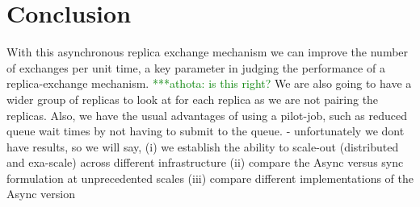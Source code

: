 \documentclass[a4paper,10pt]{article}
\newcommand{\athotanote}[1]{ {\textcolor{green} { ***athota: #1 }}}
\newcommand{\athotanote}[1]{}
\begin{document}
\section{Conclusion}
With this asynchronous replica exchange mechanism we can improve the
number of exchanges per unit time, a key parameter in judging the
performance of a replica-exchange mechanism. \athotanote{is this
  right? }  We are also going to have a wider group of replicas to
look at for each replica as we are not pairing the replicas. Also, we
have the usual advantages of using a pilot-job, such as reduced queue
wait times by not having to submit to the queue.  - unfortunately we
dont have results, so we will say, (i) we establish the ability to
scale-out (distributed and exa-scale) across different infrastructure
(ii) compare the Async versus sync formulation at unprecedented scales
(iii) compare different implementations of the Async version
 
  
 
\end{document}
